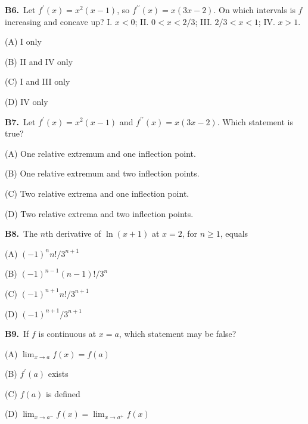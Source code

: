 \documentclass[11pt]{article}
\begin{document}
\bigskip\noindent\textbf{B6.}\ Let $f^{\prime}(x)=x^2(x-1)$, so $f^{\prime\prime}(x)=x(3x-2)$. On which intervals is $f$ increasing and concave up? I. $x<0$; II. $0<x<2/3$; III. $2/3<x<1$; IV. $x>1$.
\begin{list}{}{\setlength{\leftmargin}{3em}\setlength{\labelwidth}{2.5em}\setlength{\itemsep}{0pt}\setlength{\topsep}{2pt}}
\item[(A)] I only
\item[(B)] II and IV only
\item[(C)] I and III only
\item[(D)] IV only
\end{list}

\bigskip\noindent\textbf{B7.}\ Let $f^{\prime}(x)=x^2(x-1)$ and $f^{\prime\prime}(x)=x(3x-2)$. Which statement is true?
\begin{list}{}{\setlength{\leftmargin}{3em}\setlength{\labelwidth}{2.5em}\setlength{\itemsep}{0pt}\setlength{\topsep}{2pt}}
\item[(A)] One relative extremum and one inflection point.
\item[(B)] One relative extremum and two inflection points.
\item[(C)] Two relative extrema and one inflection point.
\item[(D)] Two relative extrema and two inflection points.
\end{list}

\bigskip\noindent\textbf{B8.}\ The $n$th derivative of $\ln(x+1)$ at $x=2$, for $n\ge1$, equals
\begin{list}{}{\setlength{\leftmargin}{3em}\setlength{\labelwidth}{2.5em}\setlength{\itemsep}{0pt}\setlength{\topsep}{2pt}}
\item[(A)] $(-1)^n n!/3^{n+1}$
\item[(B)] $(-1)^{n-1}(n-1)!/3^n$
\item[(C)] $(-1)^{n+1}n!/3^{n+1}$
\item[(D)] $(-1)^{n+1}/3^{n+1}$
\end{list}

\bigskip\noindent\textbf{B9.}\ If $f$ is continuous at $x=a$, which statement may be false?
\begin{list}{}{\setlength{\leftmargin}{3em}\setlength{\labelwidth}{2.5em}\setlength{\itemsep}{0pt}\setlength{\topsep}{2pt}}
\item[(A)] $\lim_{x\to a}f(x)=f(a)$
\item[(B)] $f^{\prime}(a)$ exists
\item[(C)] $f(a)$ is defined
\item[(D)] $\lim_{x\to a^-}f(x)=\lim_{x\to a^+}f(x)$
\end{list}
\end{document}
